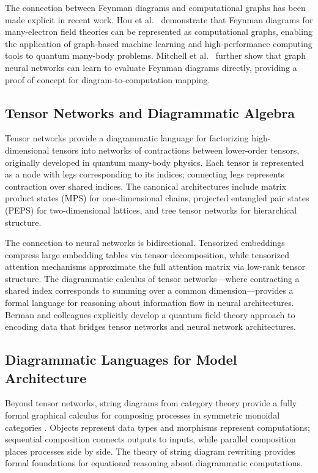 \documentclass[12pt,a4paper]{article}
\begin{document}
The connection between Feynman diagrams and computational graphs has been made explicit in recent work. Hou et al.~\cite{hou2024feynman} demonstrate that Feynman diagrams for many-electron field theories can be represented as computational graphs, enabling the application of graph-based machine learning and high-performance computing tools to quantum many-body problems. Mitchell et al.~\cite{mitchell2022learning} further show that graph neural networks can learn to evaluate Feynman diagrams directly, providing a proof of concept for diagram-to-computation mapping.

\subsection{Tensor Networks and Diagrammatic Algebra}

Tensor networks provide a diagrammatic language for factorizing high-dimensional tensors into networks of contractions between lower-order tensors, originally developed in quantum many-body physics. Each tensor is represented as a node with legs corresponding to its indices; connecting legs represents contraction over shared indices. The canonical architectures include matrix product states (MPS) for one-dimensional chains, projected entangled pair states (PEPS) for two-dimensional lattices, and tree tensor networks for hierarchical structure. 

The connection to neural networks is bidirectional. Tensorized embeddings compress large embedding tables via tensor decomposition, while tensorized attention mechanisms approximate the full attention matrix via low-rank tensor structure. The diagrammatic calculus of tensor networks---where contracting a shared index corresponds to summing over a common dimension---provides a formal language for reasoning about information flow in neural architectures. Berman and colleagues \cite{berman2024ncoder} explicitly develop a quantum field theory approach to encoding data that bridges tensor networks and neural network architectures.

\subsection{Diagrammatic Languages for Model Architecture}

Beyond tensor networks, string diagrams from category theory provide a fully formal graphical calculus for composing processes in symmetric monoidal categories \cite{marsden2014category}. Objects represent data types and morphisms represent computations; sequential composition connects outputs to inputs, while parallel composition places processes side by side. The theory of string diagram rewriting \cite{acclaviondstring} provides formal foundations for equational reasoning about diagrammatic computations.
\end{document}
